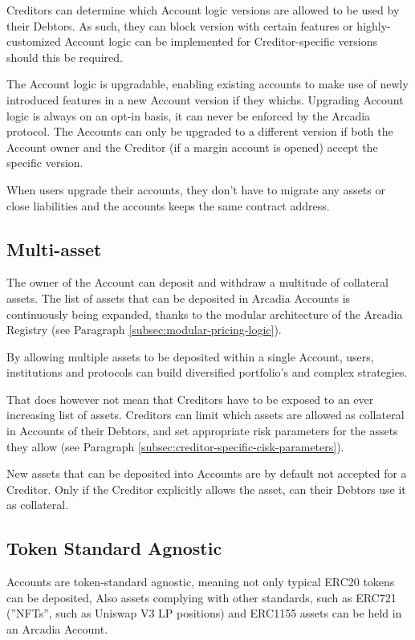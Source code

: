 \documentclass[sigconf,nonacm]{acmart}
\begin{document}
Creditors can determine which Account logic versions are allowed to be used by their Debtors.
As such, they can block version with certain features or highly-customized Account logic can be implemented for Creditor-specific versions should this be required.

The Account logic is upgradable, enabling existing accounts to make use of newly introduced features in a new Account version if they whichs.
Upgrading Account logic is always on an opt-in basis, it can never be enforced by the Arcadia protocol.
The Accounts can only be upgraded to a different version if both the Account owner and the Creditor (if a margin account is opened) accept the specific version.

When users upgrade their accounts, they don't have to migrate any assets or close liabilities and the accounts keeps the same contract address.

\subsection{Multi-asset}
\label{subsec:multi-asset}
The owner of the Account can deposit and withdraw a multitude of collateral assets.
The list of assets that can be deposited in Arcadia Accounts is continuously being expanded, thanks to the modular architecture of the Arcadia Registry (see Paragraph \ref{subsec:modular-pricing-logic}).

By allowing multiple assets to be deposited within a single Account, users, institutions and protocols can build diversified portfolio's and complex strategies.

That does however not mean that Creditors have to be exposed to an ever increasing list of assets.
Creditors can limit which assets are allowed as collateral in Accounts of their Debtors,
and set appropriate risk parameters for the assets they allow (see Paragraph \ref{subsec:creditor-specific-cisk-parameters}).

New assets that can be deposited into Accounts are by default not accepted for a Creditor.
Only if the Creditor explicitly allows the asset, can their Debtors use it as collateral.

\subsection{Token Standard Agnostic}
Accounts are token-standard agnostic, meaning not only typical ERC20 tokens can be deposited,
Also assets complying with other standards, such as ERC721 (”NFTs”, such as Uniswap V3 LP positions) and ERC1155 assets can be held in an Arcadia Account.
\end{document}
